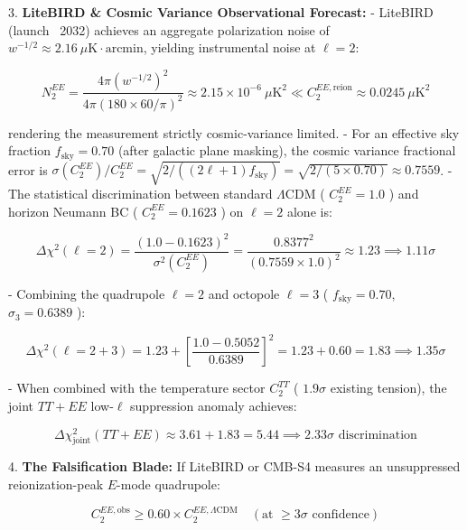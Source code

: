 \documentclass[11pt,a4paper]{article}
\theoremstyle{definition}\newtheorem{definition}{Definition}
\theoremstyle{remark}\newtheorem{remark}{Remark}
\begin{document}
3. \textbf{LiteBIRD \& Cosmic Variance Observational Forecast:}
- LiteBIRD (launch ~2032) achieves an aggregate polarization noise of $w^{-1/2} \approx 2.16\ \mu\text{K}\cdot\text{arcmin}$, yielding instrumental noise at $\ell=2$:


\begin{equation}
N_2^{EE} = \frac{4\pi (w^{-1/2})^2}{4\pi (180 \times 60 / \pi)^2} \approx 2.15 \times 10^{-6}\ \mu\text{K}^2 \ll C_2^{EE, \text{reion}} \approx 0.0245\ \mu\text{K}^2
\end{equation}


rendering the measurement strictly cosmic-variance limited.
- For an effective sky fraction $f_{\text{sky}} = 0.70$ (after galactic plane masking), the cosmic variance fractional error is $\sigma(C_2^{EE}) / C_2^{EE} = \sqrt{2 / ((2\ell+1) f_{\text{sky}})} = \sqrt{2 / (5 \times 0.70)} \approx 0.7559$.
- The statistical discrimination between standard $\Lambda$CDM ( $C_2^{EE} = 1.0$ ) and horizon Neumann BC ( $C_2^{EE} = 0.1623$ ) on $\ell=2$ alone is:


\begin{equation}
\Delta\chi^2(\ell=2) = \frac{(1.0 - 0.1623)^2}{\sigma^2(C_2^{EE})} = \frac{0.8377^2}{(0.7559 \times 1.0)^2} \approx 1.23 \implies 1.11\sigma
\end{equation}


- Combining the quadrupole $\ell=2$ and octopole $\ell=3$ ( $f_{\text{sky}} = 0.70$, $\sigma_3 = 0.6389$ ):


\begin{equation}
\Delta\chi^2(\ell=2+3) = 1.23 + \left[\frac{1.0 - 0.5052}{0.6389}\right]^2 = 1.23 + 0.60 = 1.83 \implies 1.35\sigma
\end{equation}


- When combined with the temperature sector $C_2^{TT}$ ( $1.9\sigma$ existing tension), the joint $TT + EE$ low-$\ell$ suppression anomaly achieves:


\begin{equation}
\Delta\chi^2_{\text{joint}}(TT + EE) \approx 3.61 + 1.83 = 5.44 \implies 2.33\sigma \text{ discrimination}
\end{equation}


4. \textbf{The Falsification Blade:}
If LiteBIRD or CMB-S4 measures an unsuppressed reionization-peak $E$-mode quadrupole:


\begin{equation}
C_2^{EE, \text{obs}} \ge 0.60 \times C_2^{EE, \Lambda\text{CDM}} \quad (\text{at } \ge 3\sigma \text{ confidence})
\end{equation}
\end{document}
